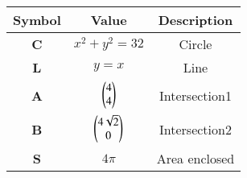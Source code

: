 \begin{tabular}[12pt]{ |c|c|c|}
    \hline
    \textbf{Symbol} & \textbf{Value} & \textbf{Description} \\
    \hline
    \textbf{C} & $x^{2}+y^{2}=32$ & Circle\\
    \hline
    \textbf{L} & $y=x$ & Line\\
    \hline
    \textbf{A} & $\begin{pmatrix}4\\4\end{pmatrix}$ & Intersection1\\
    \hline
    \textbf{B} & $\begin{pmatrix}4\sqrt{2}\\0\end{pmatrix}$ & Intersection2\\
    \hline
    \textbf{S} & $4\pi$ & Area enclosed\\
	\hline
    \end{tabular}
